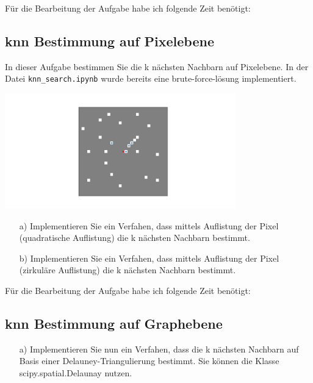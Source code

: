 Für die Bearbeitung der Aufgabe habe ich folgende Zeit benötigt:

\subsection{knn Bestimmung auf Pixelebene}

In dieser Aufgabe bestimmen Sie die k nächsten Nachbarn auf Pixelebene. In der Datei \texttt{knn\_search.ipynb} wurde bereits eine
brute-force-lösung implementiert. 

\includegraphics[width=0.75\textwidth]{source_code/knn_search_brute_force.png}

\begin{enumerate}

\item[a)] Implementieren Sie ein Verfahen, dass mittels Auflistung der Pixel (quadratische Auflistung) die k nächsten Nachbarn bestimmt.

\item[b)] Implementieren Sie ein Verfahen, dass mittels Auflistung der Pixel (zirkuläre Auflistung) die k nächsten Nachbarn bestimmt.

\end{enumerate}

Für die Bearbeitung der Aufgabe habe ich folgende Zeit benötigt:

\subsection{knn Bestimmung auf Graphebene}

\begin{enumerate}

\item[a)] Implementieren Sie nun ein Verfahen, dass die k nächsten Nachbarn auf Basis einer Delauney-Triangulierung bestimmt. Sie können die Klasse scipy.spatial.Delaunay nutzen.

\end{enumerate}

